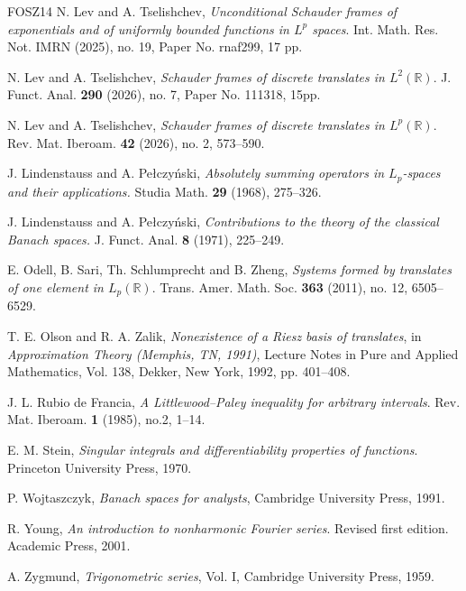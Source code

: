 \documentclass[reqno,a4paper,12pt]{amsart}
\numberwithin{equation}{section}
\numberwithin{figure}{section}
\newcommand\R{\mathbb{R}}
\newcommand\1{\mathds{1}}
\theoremstyle{plain}
\theoremstyle{definition}
\begin{document}
\begin{thebibliography}{FOSZ14}
N. Lev and A. Tselishchev, 
\emph{Unconditional Schauder frames of exponentials and of uniformly bounded functions in $L^p$ spaces}. Int. Math. Res. Not. IMRN (2025), no. 19, Paper No. rnaf299, 17 pp.

N. Lev and A. Tselishchev,
\emph{Schauder frames of discrete translates in $L^2(\R)$}.
J. Funct. Anal. \textbf{290} (2026), no. 7, Paper No. 111318, 15pp.

N. Lev and A. Tselishchev,
\emph{Schauder frames of discrete translates in $L^p(\R)$}.
Rev. Mat. Iberoam. \textbf{42} (2026), no. 2, 573--590.

J. Lindenstauss and A. Pe{\l}czy\'{n}ski,
\emph{Absolutely summing operators in $L_p$-spaces and their applications.} 
Studia Math. \textbf{29} (1968), 275--326.

J. Lindenstauss and A. Pe{\l}czy\'{n}ski,
\emph{Contributions to the theory of the classical Banach spaces.}
J. Funct. Anal. \textbf{8} (1971), 225--249.

E. Odell, B. Sari, Th. Schlumprecht and B. Zheng, \emph{Systems formed by translates of one element in $L_p(\mathbb{R})$}. Trans. Amer. Math. Soc. \textbf{363} (2011), no. 12, 6505--6529.

T. E. Olson and R. A. Zalik, 
\emph{Nonexistence of a Riesz basis of translates}, 
in \emph{Approximation Theory (Memphis, TN, 1991)}, 
Lecture Notes in Pure and Applied Mathematics, 
Vol. 138, Dekker, New York, 1992, pp. 401--408.

J. L. Rubio de Francia, 
\emph{A Littlewood--Paley inequality for arbitrary intervals}. 
Rev. Mat. Iberoam. \textbf{1} (1985), no.2, 1--14.

E. M. Stein, 
\emph{Singular integrals and differentiability properties of functions}.
Princeton University Press, 1970.

P. Wojtaszczyk, \emph{Banach spaces for analysts}, Cambridge University Press, 1991.

R. Young, \emph{An introduction to nonharmonic Fourier series}.
Revised first edition. Academic Press, 2001.

A. Zygmund, \emph{Trigonometric series}, Vol. I,
Cambridge University Press, 1959.

\end{thebibliography}
\end{document}
